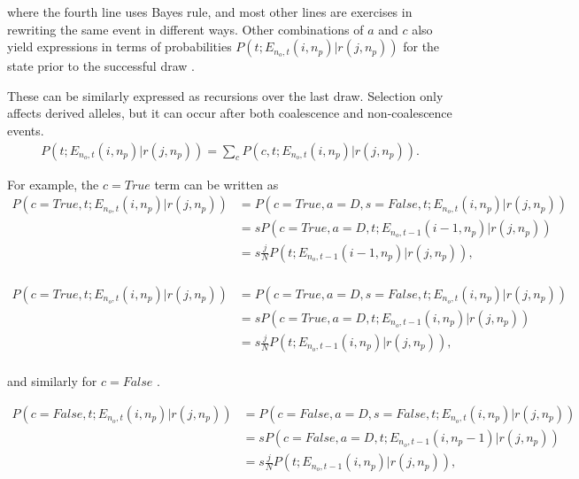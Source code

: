 \documentclass[review]{elsarticle}
\newcommand{\sgcomment}[1]{{\color{red}{SG: #1}}}
\begin{document}
where the fourth line uses Bayes rule, and most other lines are exercises in rewriting the same
event in different ways. Other combinations of $a$ and $c$ also yield expressions in terms of
probabilities $P(t; E_{n_o,t}(i,n_p) | r(j, n_p))$ for the state prior to the successful draw
\sgcomment{write down final results?}.


These can be similarly expressed as recursions over the last draw. Selection only affects derived alleles, but it can occur after both coalescence and non-coalescence events. 
\begin{equation}
\begin{split}
P(t;  E_{n_o,t}(i,n_p) | r(j, n_p)) = \sum_c P(c, t;  E_{n_o,t}(i,n_p) | r(j, n_p)).
\end{split}
\end{equation}

For example, the $c = True$ term can be written as 
 \begin{equation}
\begin{split}
P(c=True, t;  E_{n_o,t}(i,n_p) | r(j, n_p)) &= P(c=True, a=D, s=False, t;  E_{n_o,t}(i,n_p) | r(j, n_p))\\
&= s P(c=True, a=D, t;  E_{n_o,t-1}(i-1,n_p) | r(j, n_p))\\
&= s \frac{j}{N} P( t;  E_{n_o,t-1}(i-1,n_p) | r(j, n_p)),\\
\end{split}
\end{equation}

\sgcomment{I think this might want to be: }
 \begin{equation}
\begin{split}
P(c=True, t;  E_{n_o,t}(i,n_p) | r(j, n_p)) &= P(c=True, a=D, s=False, t;  E_{n_o,t}(i,n_p) | r(j, n_p))\\
&= s P(c=True, a=D, t;  E_{n_o,t-1}(i,n_p) | r(j, n_p))\\
&= s \frac{j}{N} P( t;  E_{n_o,t-1}(i,n_p) | r(j, n_p)),\\
\end{split}
\end{equation}


and similarly for $c=False$ \sgcomment{Write out? TODO, not complete}.  

 \begin{equation}
\begin{split}
P(c=False, t;  E_{n_o,t}(i,n_p) | r(j, n_p)) &= P(c=False, a=D, s=False, t;  E_{n_o,t}(i,n_p) | r(j, n_p))\\
&= s P(c=False, a=D, t;  E_{n_o,t-1}(i,n_p-1) | r(j, n_p))\\
&= s \frac{j}{N} P( t;  E_{n_o,t-1}(i,n_p) | r(j, n_p)),\\
\end{split}
\end{equation}
\end{document}
